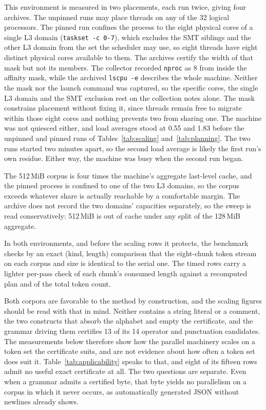 \documentclass[11pt,a4paper]{article}
\theoremstyle{definition}
\theoremstyle{plain}
\newcommand{\code}[1]{\texttt{#1}}
\begin{document}
This environment is measured in two placements, each run twice, giving four archives. The unpinned runs may place
threads on any of the 32 logical processors. The pinned run confines the process to the eight physical cores of a single
L3 domain (\code{taskset -c 0-7}), which excludes the SMT siblings and the other L3 domain from the set the scheduler
may use, so eight threads have eight distinct physical cores available to them. The archives certify the width of that
mask but not its members. The collector recorded \code{nproc} as 8 from inside the affinity mask, while the archived
\code{lscpu -e} describes the whole machine. Neither the mask nor the launch command was captured, so the specific
cores, the single L3 domain and the SMT exclusion rest on the collection notes alone. The mask constrains placement
without fixing it, since threads remain free to migrate within those eight cores and nothing prevents two from sharing
one. The machine was not quiesced either, and load averages stood at 0.55 and 1.83 before the unpinned and pinned runs
of Tables~\ref{tab:scaling} and~\ref{tab:planning}. The two runs started two minutes apart, so the second load average
is likely the first run's own residue. Either way, the machine was busy when the second run began.

The 512\,MiB corpus is four times the machine's aggregate last-level cache, and the pinned process is confined to one of
the two L3 domains, so the corpus exceeds whatever share is actually reachable by a comfortable margin. The archive does
not record the two domains' capacities separately, so the sweep is read conservatively: 512\,MiB is out of cache under
any split of the 128\,MiB aggregate.

In both environments, and before the scaling rows it protects, the benchmark checks by an exact (kind, length)
comparison that the eight-chunk token stream on each corpus and size is identical to the serial one. The timed rows
carry a lighter per-pass check of each chunk's consumed length against a recomputed plan and of the total token count.

Both corpora are favorable to the method by construction, and the scaling figures should be read with that in mind.
Neither contains a string literal or a comment, the two constructs that absorb the alphabet and empty the certificate,
and the grammar driving them certifies 13 of its 14 operator and punctuation candidates. The measurements below
therefore show how the parallel machinery scales on a token set the certificate suits, and are not evidence about how
often a token set does suit it. Table~\ref{tab:applicability} speaks to that, and eight of its fifteen rows admit no
useful exact certificate at all. The two questions are separate. Even when a grammar admits a certified byte, that byte
yields no parallelism on a corpus in which it never occurs, as automatically generated JSON without newlines already
shows.
\end{document}
